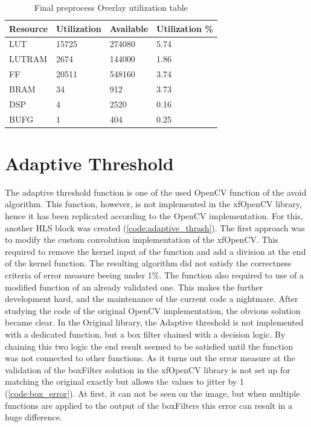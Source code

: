 
\begin{table}
\centering
\caption{Final preprocess Overlay utilization table}
\label{tab:preproc_final_usage}
\begin{tabular}{|l|l|l|l|}
\hline
Resource & Utilization & Available & Utilization \% \\ \hline
LUT & 15725 & 274080 & 5.74 \\ \hline
LUTRAM & 2674 & 144000 & 1.86 \\ \hline
FF & 20511 & 548160 & 3.74 \\ \hline
BRAM & 34 & 912 & 3.73 \\ \hline
DSP & 4 & 2520 & 0.16 \\ \hline
BUFG & 1 & 404 & 0.25 \\ \hline
\end{tabular}
\end{table}


\clearpage

\section{Adaptive Threshold} %
The adaptive threshold function is one of the used OpenCV function of the avoid algorithm.
This function, however, is not implemented in the xfOpenCV library, hence it has been replicated according to the OpenCV implementation.
For this, another HLS block was created (\cref{code:adaptive_thrash}).
The first approach was to modify the custom convolution implementation of the xfOpenCV.
This required to remove the kernel input of the function and add a division at the end of the kernel function.
The resulting algorithm did not satisfy the correctness criteria of error measure beeing under 1\%.
The function also required to use of a modified function of an already validated one.
This makes the further development hard, and the maintenance of the current code a nightmare.
After studying the code of the original OpenCV implementation, the obvious solution became clear.
In the Original library, the Adaptive threshold is not implemented with a dedicated function, but a box filter chained with a decision logic.
By chaining this two logic the end result seemed to be satisfied until the function was not connected to other functions.
As it turns out the error measure at the validation of the boxFilter solution in the xfOpenCV library is not set up for matching the original exactly but allows the values to jitter by 1 (\cref{code:box_error}).
At first, it can not be seen on the image, but when multiple functions are applied to the output of the boxFilters this error can result in a huge difference.

